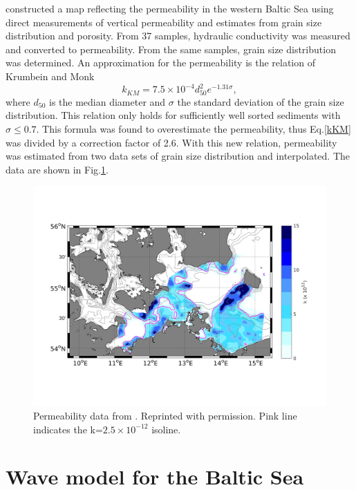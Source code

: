 \cite{forster2003} constructed a map reflecting the permeability in the western 
Baltic Sea using direct measurements of vertical permeability and estimates 
from grain size distribution and porosity. From 37 samples, hydraulic 
conductivity was measured and converted to permeability. From the same samples, 
grain size distribution was determined. An approximation for the permeability 
is the relation of Krumbein and Monk \citep[][]{krumbein1942}
\begin{equation}
 \label{kKM}
 k_{KM} = 7.5 \times 10^{-4} d_{50}^2 e^{-1.31 \sigma},
\end{equation}
where $d_{50}$ is the median diameter and $\sigma$ the standard deviation of 
the grain size distribution. This relation only holds for sufficiently well 
sorted sediments with $\sigma \leq 0.7$. This formula was found to overestimate 
the permeability, thus Eq.\ref{kKM} was divided by a correction factor of 2.6.  
With this new relation, permeability was estimated from two data sets of grain 
size distribution and interpolated. The data are shown in Fig.\ref{perm}.
\begin{figure}[ht]
 \includegraphics[width=16cm]{bilder/perm_k.png}
 \caption{Permeability data from \cite{forster2003}. Reprinted 
with permission. Pink line indicates the k=$2.5\times10^{-12}$ 
isoline.\label{perm}}
\end{figure}

\section{Wave model for the Baltic Sea}\label{balticswan}

